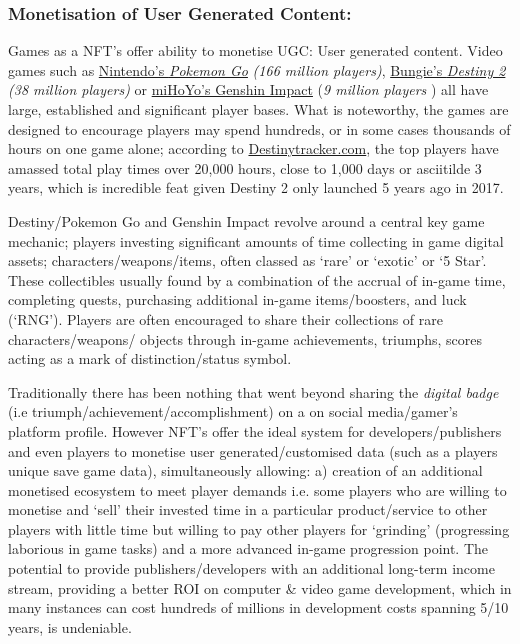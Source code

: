 \subsubsection{Monetisation of User Generated Content:} Games as a NFT's
  offer ability to monetise UGC: User generated content. Video games such as
\href{https://www.businessofapps.com/data/pokemon-go-statistics/}{Nintendo's
\emph{Pokemon Go}} \emph{(166 million players)},
\href{https://techacake.com/destiny-2-player-count/\#:~:text=The\%20total\%20player\%20base\%20of,to\%20be\%2038\%20million\%20players.\&text=According\%20to\%20the\%20source\%2C\%20the,in\%20terms\%20of\%20player\%20population.}{Bungie's
\emph{Destiny 2}} \emph{(38 million players)} or
\href{https://fictionhorizon.com/how-many-people-play-genshin-impact/\#:~:text=Genshin\%20Impact\%20had\%20approximately\%209,million\%20users\%20in\%20June\%202021.}{miHoYo's
Genshin Impact} (\emph{9 million players} ) all have large, established
and significant player bases. What is noteworthy, the games are designed
to encourage players may spend hundreds, or in some cases thousands of
hours on one game alone; according to
\href{https://destinytracker.com/destiny/leaderboards/all/minutesplayedtotal?grouped=true\&page=1}{Destinytracker.com},
the top players have amassed total play times over 20,000 hours, close
to 1,000 days or asciitilde{} 3 years, which is incredible feat
given Destiny 2 only launched 5 years ago in 2017.\par
Destiny/Pokemon Go and Genshin Impact revolve around a central key game
mechanic; players investing significant amounts of time collecting in
game digital assets; characters/weapons/items, often classed as `rare'
or `exotic' or `5 Star'. These collectibles usually found by a
combination of the accrual of in-game time, completing quests,
purchasing additional in-game items/boosters, and luck (`RNG'). Players
are often encouraged to share their collections of rare
characters/weapons/ objects through in-game achievements, triumphs,
scores acting as a mark of distinction/status symbol.\par
Traditionally there has been nothing that went beyond sharing the
\emph{digital badge} (i.e triumph/achievement/accomplishment) on a on
social media/gamer's platform profile. However NFT's offer the ideal
system for developers/publishers and even players to monetise user
generated/customised data (such as a players unique save game data), simultaneously allowing:
a) creation of an additional monetised ecosystem to meet player demands
i.e. some players who are willing to monetise and `sell' their invested
time in a particular product/service to other players with little time
but willing to pay other players for `grinding' (progressing laborious
in game tasks) and a more advanced in-game progression point.
The potential to provide publishers/developers with an additional
long-term income stream, providing a better ROI on computer \& video
game development, which in many instances can cost hundreds of millions
in development costs spanning 5/10 years, is undeniable.
